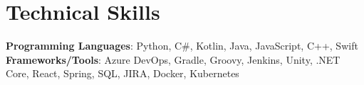 \section{Technical Skills}
 \begin{itemize}[leftmargin=0.15in, label={}]
    \small{\item{
      \textbf{Programming Languages}{: Python, C\#, Kotlin, Java, JavaScript, C++, Swift } \\
     \textbf{Frameworks/Tools}{: Azure DevOps, Gradle, Groovy, Jenkins, Unity, .NET Core, React, Spring, SQL, JIRA, Docker, Kubernetes }\\
    }}
 \end{itemize}